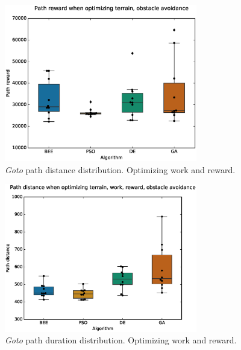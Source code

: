 \documentclass{tamuccthesis}
\begin{document}
\begin{figure}
    \captionsetup{justification=centering}
    \centering
    \includegraphics[width=0.75\textwidth,trim={0cm 0.75cm 0cm 0.75cm},clip]{EXP3_histo_reward_a.eps}
    \caption{\textit{Goto} path distance distribution. Optimizing work and reward. }
    \label{fig:algcompare_a_reward}
\end{figure}

\begin{figure}
    \captionsetup{justification=centering}
    \centering
    \includegraphics[width=0.75\textwidth,trim={0cm 0.75cm 0cm 0.75cm},clip]{EXP3_histo_distance_b.eps}
    \caption{\textit{Goto} path duration distribution. Optimizing work and reward. }
    \label{fig:algcompare_b_distance}
\end{figure}
\end{document}
